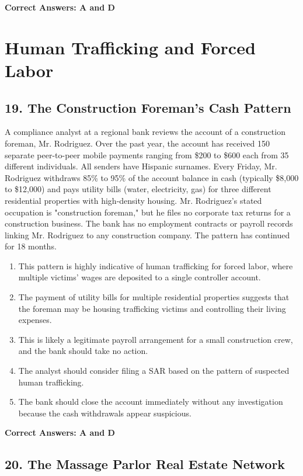 \documentclass[11pt,a4paper]{article}
\begin{document}
	\textbf{Correct Answers: A and D}
	
	\section{Human Trafficking and Forced Labor}
	
	\subsection{19. The Construction Foreman's Cash Pattern}
	
	A compliance analyst at a regional bank reviews the account of a construction foreman, Mr. Rodriguez. Over the past year, the account has received 150 separate peer-to-peer mobile payments ranging from \$200 to \$600 each from 35 different individuals. All senders have Hispanic surnames. Every Friday, Mr. Rodriguez withdraws 85\% to 95\% of the account balance in cash (typically \$8,000 to \$12,000) and pays utility bills (water, electricity, gas) for three different residential properties with high-density housing. Mr. Rodriguez's stated occupation is "construction foreman," but he files no corporate tax returns for a construction business. The bank has no employment contracts or payroll records linking Mr. Rodriguez to any construction company. The pattern has continued for 18 months.
	
	\begin{enumerate}[label=\Alph*.]
		\item This pattern is highly indicative of human trafficking for forced labor, where multiple victims' wages are deposited to a single controller account.
		\item The payment of utility bills for multiple residential properties suggests that the foreman may be housing trafficking victims and controlling their living expenses.
		\item This is likely a legitimate payroll arrangement for a small construction crew, and the bank should take no action.
		\item The analyst should consider filing a SAR based on the pattern of suspected human trafficking.
		\item The bank should close the account immediately without any investigation because the cash withdrawals appear suspicious.
	\end{enumerate}
	
	\textbf{Correct Answers: A and D}
	
	\subsection{20. The Massage Parlor Real Estate Network}
	
\end{document}
